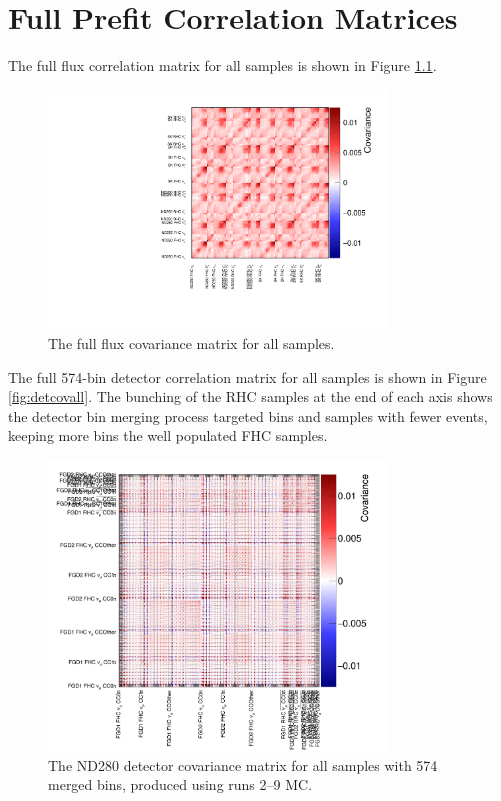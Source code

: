 \chapter{Full Prefit Correlation Matrices}\label{app:matrices}

The full flux correlation matrix for all samples is shown in Figure \ref{fig:fluxcov}.

\begin{figure}[!htbp]
\centering
\includegraphics*[width=0.8\textwidth,clip]{figs/fluxcov}
\caption{The full flux covariance matrix for all samples.}\label{fig:fluxcov}
\end{figure}

The full 574-bin detector correlation matrix for all samples is shown in Figure \ref{fig:detcovall}. The bunching of the RHC samples at the end of each axis shows the detector bin merging process targeted bins and samples with fewer events, keeping more bins the well populated FHC samples.

\begin{figure}[!htbp]
\centering
\includegraphics*[width=0.8\textwidth,clip]{figs/detcov574}
\caption{The ND280 detector covariance matrix for all samples with 574 merged bins, produced using runs 2--9 MC.}\label{fig:detcorr574All}
\end{figure}

